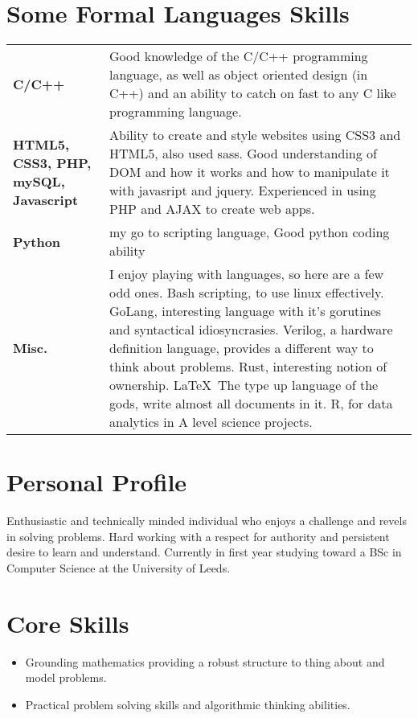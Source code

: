 \documentclass[9pt,a4paper]{article}
\begin{document}
\begin{multicols*}{2}
  \section*{Some Formal Languages Skills}
\begin{center}
  \begin{tabular}{p{2cm} p{6cm}}
  \textbf{C/C++}&Good knowledge of the C/C++ programming language, as well as object oriented design (in C++) and an ability to catch on fast to any C like programming language.\\[.1cm]
  \textbf{HTML5, CSS3, PHP, mySQL, Javascript}&Ability to create and style websites using CSS3 and HTML5, also used sass. Good understanding of DOM and how it works and how to manipulate it with javasript and jquery.
  Experienced in using PHP and AJAX to create web apps.\\[.1cm]
  \textbf{Python}&my go to scripting language, Good python coding ability\\[.1cm]
  \textbf{Misc.}&I enjoy playing with languages, so here are a few odd ones.
  Bash scripting, to use linux effectively.
  GoLang, interesting language with it's gorutines and syntactical idiosyncrasies.
  Verilog, a hardware definition language, provides a different way to think about problems.
  Rust, interesting notion of ownership.
  \LaTeX\ The type up language of the gods, write almost all documents in it.
  R, for data analytics in A level science projects. 
\end{tabular}
\end{center}

\section*{Personal Profile}
Enthusiastic and technically minded individual who enjoys a challenge and revels in solving problems.
Hard working with a respect for authority and persistent desire to learn and understand.
Currently in first year studying toward a BSc in Computer Science at the University of Leeds.

\section*{Core Skills}
\begin{itemize}
\item Grounding mathematics providing a robust structure to thing about and model problems.

\item Practical problem solving skills and algorithmic thinking abilities.


\end{itemize}
\end{multicols*}
\end{document}
